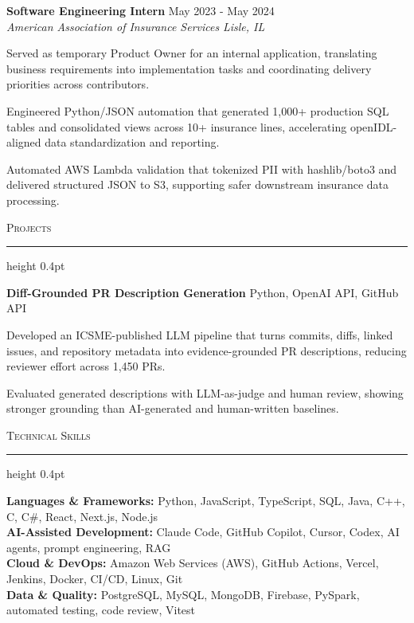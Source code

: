 \documentclass[letterpaper,11pt]{article}
\newcommand{\resumesection}[1]{%
  \par\vspace{2pt}%
  {\large\scshape #1}\par\vspace{2pt}%
  \hrule height 0.4pt\vspace{2pt}%
}
\newcommand{\resumeSubheading}[4]{
  \textbf{#1} \hfill #2\\
  \textit{#3} \hfill \textit{#4}
}
\newcommand{\projectHeading}[2]{
  \textbf{#1} \hfill #2
}
\begin{document}
\resumeSubheading
{Software Engineering Intern}{May 2023 - May 2024}
{American Association of Insurance Services}{Lisle, IL}
\begin{tightitemize}
  \item Served as temporary Product Owner for an internal application, translating business requirements into implementation tasks and coordinating delivery priorities across contributors.
  \item Engineered Python/JSON automation that generated 1,000+ production SQL tables and consolidated views across 10+ insurance lines, accelerating openIDL-aligned data standardization and reporting.
  \item Automated AWS Lambda validation that tokenized PII with hashlib/boto3 and delivered structured JSON to S3, supporting safer downstream insurance data processing.
\end{tightitemize}

\resumesection{Projects}
\projectHeading{Diff-Grounded PR Description Generation}{Python, OpenAI API, GitHub API}
\begin{tightitemize}
  \item Developed an ICSME-published LLM pipeline that turns commits, diffs, linked issues, and repository metadata into evidence-grounded PR descriptions, reducing reviewer effort across 1,450 PRs.
  \item Evaluated generated descriptions with LLM-as-judge and human review, showing stronger grounding than AI-generated and human-written baselines.
\end{tightitemize}

\resumesection{Technical Skills}
\textbf{Languages \& Frameworks:} Python, JavaScript, TypeScript, SQL, Java, C++, C, C\#, React, Next.js, Node.js\\
\textbf{AI-Assisted Development:} Claude Code, GitHub Copilot, Cursor, Codex, AI agents, prompt engineering, RAG\\

\textbf{Cloud \& DevOps:} Amazon Web Services (AWS), GitHub Actions, Vercel, Jenkins, Docker, CI/CD, Linux, Git\\
\textbf{Data \& Quality:} PostgreSQL, MySQL, MongoDB, Firebase, PySpark, automated testing, code review, Vitest
\end{document}
